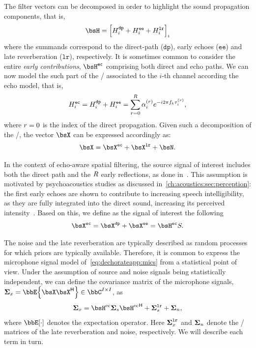 \mynewline
The filter vectors can be decomposed in order to highlight the sound propagation components, that is,
\begin{equation}
    \FLTS = \kbracket{\FLT^{\mathtt{dp}}_{\idxMic} + \FLT^{\mathtt{ee}}_{\idxMic} + \FLT^{\mathtt{lr}}_{\idxMic} }_\idxMic
\end{equation}
where the summands correspond to the direct-path ($\mathtt{dp}$), early echoes ($\mathtt{ee}$) and late reverberation ($\mathtt{lr}$), respectively.
It is sometimes common to consider the entire \textit{early contributions}, $\FLTS^{\mathtt{ec}}$ comprising both direct and echo paths.
We can now model the such part of the \RIR/ associated to the $i$-th channel according the echo model, that is,
\begin{equation}\label{eq:dechorateapp:echomodel}
    H^{\mathtt{ec}}_{i} = H^{\mathtt{dp}}_{i}+ H^{\mathtt{ee}}_{i} = \sum_{r=0}^{R} \alpha_{i}^{(r)} {e}^{-{i} 2 \pi f_k \tau_i^{(r)}}
    ,
\end{equation}
where $r=0$ is the index of the direct propagation.
Given such a decomposition of the \RIRs/, the vector $\MICS$ can be expressed accordingly as:
\begin{equation}\label{eq:dechorateapp:mics}
    \MICS = \MICS^{\mathtt{ec}} + \MICS^{\mathtt{lr}} + \NSES.
\end{equation}

\mynewline
In the context of echo-aware spatial filtering, the source signal of interest includes both the direct path and the $R$ early reflections, as done in~.
This assumption is motivated by psychoacoustics studies as discussed in~\cref{ch:acoustics:sec:perception}:
the first early echoes are shown to contribute to increasing speech intelligibility, as they are fully integrated into the direct sound, increasing its perceived intensity~.
Based on this, we define as the signal of interest the following
\begin{equation}\label{eq:dechorateapp:target}
    \MICS^{\mathtt{ec}} = \MICS^{\mathtt{dp}} + \MICS^{\mathtt{ee}} = \FLTS^{\mathtt{ec}} \SRC.
\end{equation}

\mynewline
The noise and the late reverberation are typically described as random processes for which priors are typically available.
Therefore, it is common to express the microphone signal model of~\cref{eq:dechorateapp:mics} from a statistical point of view.
Under the assumption of source and noise signals being statistically independent, we can define the covariance matrix of the microphone signals, $\xpsd_{\mic} = \bbE\kbrace{\MICS \khermitian{\MICS}} \in \bbC^{\numMics \times \numMics}$, as
\begin{equation}
    \xpsd_{\mic} = \FLTS^{\mathrm{ec}} \xpsd_{\src} \khermitian{\FLTS^{\mathrm{ec}}} + \xpsd^{\mathtt{lr}}_{\src} + \xpsd_{\nse}
    ,
\end{equation}
where $\bbE[\cdot]$ denotes the expectation operator.
Here $\boldsymbol{\Sigma}^{\mathtt{lr}}_{x}$ and $\boldsymbol{\Sigma}_{n}$ denote the \PSD/ matrices of the late reverberation and noise, respectively.
We will describe each term in turn.

